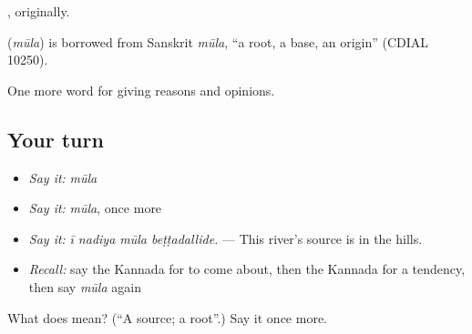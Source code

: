 , originally.

\begin{cousinweb}
\textbf{} (\emph{mūla}) is borrowed from Sanskrit \emph{mūla}, \textquotedblleft{}a root, a base, an origin\textquotedblright{} (CDIAL 10250).
\end{cousinweb}

\begin{grammarlens}[title={What you've built}]
One more word for giving reasons and opinions.
\end{grammarlens}

\subsection*{Your turn}
\begin{itemize}
\raggedright
  \item \emph{Say it:} \emph{mūla}
  \item \emph{Say it:} \emph{mūla}, once more
  \item \emph{Say it:} \emph{ī nadiya mūla beṭṭadallide.} — This river's source is in the hills.
  \item \emph{Recall:} say the Kannada for to come about, then the Kannada for a tendency, then say \emph{mūla} again
\end{itemize}

\begin{tcolorbox}[breakable,colback=teal!4,colframe=teal!35!black,title={Before you move on}]
What does  mean? (\textquotedblleft{}A source; a root\textquotedblright{}.) Say it once more.
\end{tcolorbox}
